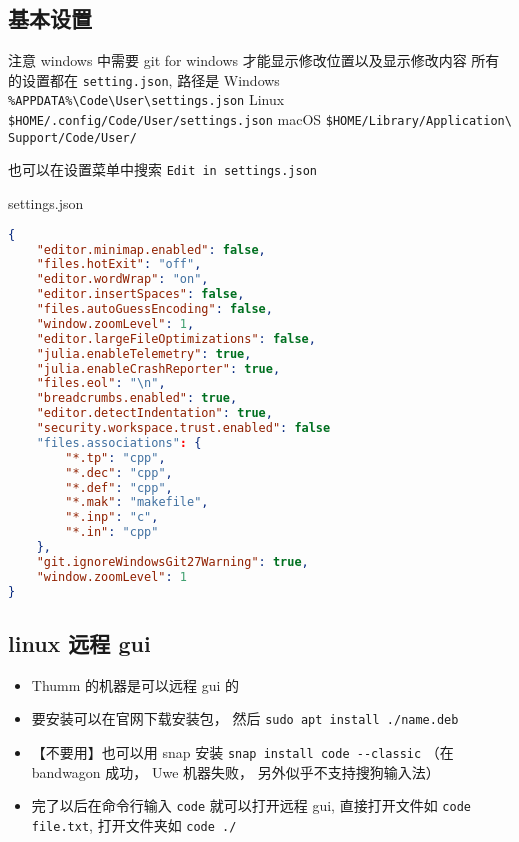 
\subsection{基本设置}

注意 windows 中需要 git for windows 才能显示修改位置以及显示修改内容
所有的设置都在 \verb`setting.json`, 路径是
Windows \verb`%APPDATA%\Code\User\settings.json`
Linux \verb`$HOME/.config/Code/User/settings.json`
macOS \verb`$HOME/Library/Application\ Support/Code/User/`

也可以在设置菜单中搜索 \verb`Edit in settings.json`

settings.json

\begin{lstlisting}[language=json]
{
	"editor.minimap.enabled": false,
	"files.hotExit": "off",
	"editor.wordWrap": "on",
    "editor.insertSpaces": false,
	"files.autoGuessEncoding": false,
	"window.zoomLevel": 1,
	"editor.largeFileOptimizations": false,
	"julia.enableTelemetry": true,
	"julia.enableCrashReporter": true,
	"files.eol": "\n",
	"breadcrumbs.enabled": true,
	"editor.detectIndentation": true,
	"security.workspace.trust.enabled": false
	"files.associations": {
		"*.tp": "cpp",
		"*.dec": "cpp",
		"*.def": "cpp",
		"*.mak": "makefile",
		"*.inp": "c",
		"*.in": "cpp"
	},
	"git.ignoreWindowsGit27Warning": true,
	"window.zoomLevel": 1
}
\end{lstlisting}


\subsection{linux 远程 gui}
\begin{itemize}
\item Thumm 的机器是可以远程 gui 的
\item 要安装可以在官网下载安装包， 然后 \verb`sudo apt install ./name.deb`
\item 【不要用】也可以用 snap 安装 \verb`snap install code --classic` （在 bandwagon 成功， Uwe 机器失败， 另外似乎不支持搜狗输入法）
\item 完了以后在命令行输入 \verb`code` 就可以打开远程 gui, 直接打开文件如 \verb`code file.txt`, 打开文件夹如 \verb`code ./`
\end{itemize}
